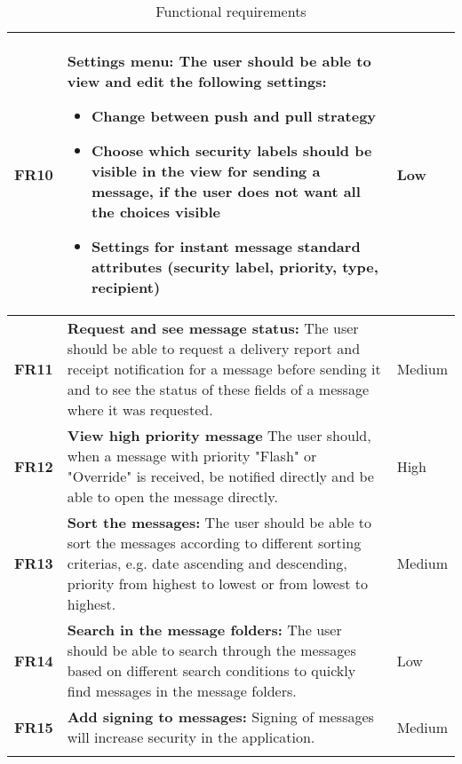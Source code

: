 \begin{longtable}{>{\setlength\hsize{.3\hsize}}X|>{\setlength\hsize{0.9\hsize}}X|>{\setlength\hsize{.3\hsize}}X}
\textbf{FR10} & \textbf{Settings menu:} The user should be able to view and edit the following settings:
\begin{itemize}
\item{}Change between push and pull strategy
\item{}Choose which security labels should be visible in the view for sending a message, if the user does not want all the choices visible
\item{}Settings for instant message standard attributes (security label, priority, type, recipient)
\end{itemize}  & Low \\ \hline

\textbf{FR11} & \textbf{Request and see message status:} The user should be able to request a delivery report and receipt notification for a message before sending it and to see the status of these fields of a message where it was requested. & Medium \\ \hline

\textbf{FR12} & \textbf{View high priority message} The user should, when a message with priority "Flash" or "Override" is received, be notified directly and be able to open the message directly. & High \\ \hline

\textbf{FR13} & \textbf{Sort the messages:} The user should be able to sort the messages according to different sorting criterias, e.g. date ascending and descending, priority from highest to lowest or from lowest to highest. & Medium \\ \hline

\textbf{FR14} & \textbf{Search in the message folders:} The user should be able to search through the messages based on different search conditions to quickly find messages in the message folders. & Low \\ \hline

\textbf{FR15} & \textbf{Add signing to messages:} Signing of messages will increase security in the application. & Medium \\ \hline

\caption{Functional requirements} \label{tab:functionalrequirements}
\end{longtable}